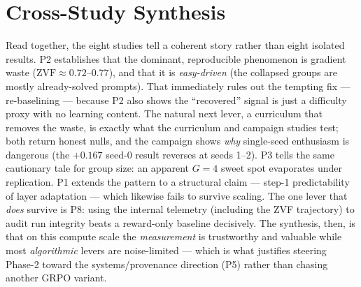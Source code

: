 \documentclass[12pt,a4paper]{report}
\newcommand{\zvf}{\mathrm{ZVF}}
\begin{document}
\section{Cross-Study Synthesis}
Read together, the eight studies tell a coherent story rather than eight isolated
results. P2 establishes that the dominant, reproducible phenomenon is gradient waste
($\zvf\approx0.72$--$0.77$), and that it is \emph{easy-driven} (the collapsed groups
are mostly already-solved prompts). That immediately rules out the tempting fix ---
re-baselining --- because P2 also shows the ``recovered'' signal is just a difficulty
proxy with no learning content. The natural next lever, a curriculum that removes the
waste, is exactly what the curriculum and campaign studies test; both return honest
nulls, and the campaign shows \emph{why} single-seed enthusiasm is dangerous (the
$+0.167$ seed-0 result reverses at seeds 1--2). P3 tells the same cautionary tale for
group size: an apparent $G{=}4$ sweet spot evaporates under replication. P1 extends
the pattern to a structural claim --- step-1 predictability of layer adaptation ---
which likewise fails to survive scaling. The one lever that \emph{does} survive is P8:
using the internal telemetry (including the ZVF trajectory) to audit run integrity
beats a reward-only baseline decisively. The synthesis, then, is that on this
compute scale the \emph{measurement} is trustworthy and valuable while most
\emph{algorithmic} levers are noise-limited --- which is what justifies steering
Phase-2 toward the systems/provenance direction (P5) rather than chasing another
GRPO variant.
\end{document}
